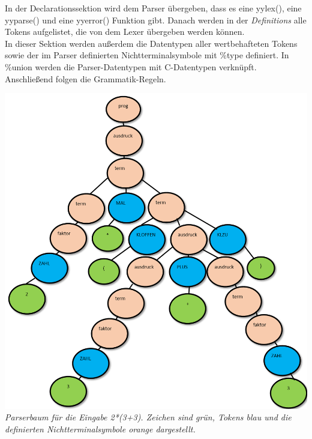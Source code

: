 \documentclass[11pt]{report}
\begin{document}
In der Declarationssektion wird dem Parser übergeben, dass es eine yylex(), eine yyparse() und eine yyerror() Funktion gibt.
Danach werden in der \textit{Definitions} alle Tokens aufgelistet, die von dem Lexer übergeben werden können.\\
In dieser Sektion werden außerdem die Datentypen aller wertbehafteten Tokens sowie der im Parser definierten Nichtterminalsymbole mit \%type definiert. In \%union werden die Parser-Datentypen mit C-Datentypen verknüpft.\\
Anschließend folgen die Grammatik-Regeln.
\begin{center}
\includegraphics[scale=0.6]{Publikation1.png}
\\
\textit{Parserbaum für die Eingabe 2*(3+3). Zeichen sind grün, Tokens blau und die definierten Nichtterminalsymbole orange dargestellt.}
\end{center}

\end{document}
